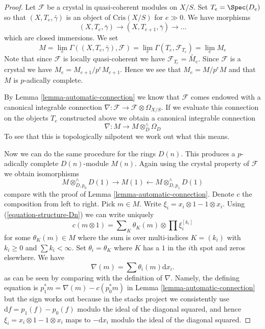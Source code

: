\begin{proof}
Let $\mathcal{F}$ be a crystal in quasi-coherent modules on $X/S$.
Set $T_e = \Spec(D_e)$ so that $(X, T_e, \bar\gamma)$ is an object
of $\text{Cris}(X/S)$ for $e \gg 0$. We have morphisms
$$
(X, T_e, \bar\gamma) \to (X, T_{e + 1}, \bar\gamma) \to \ldots
$$
which are closed immersions. We set
$$
M =
\lim_e \Gamma((X, T_e, \bar\gamma), \mathcal{F}) =
\lim_e \Gamma(T_e, \mathcal{F}_{T_e}) = \lim_e M_e
$$
Note that since $\mathcal{F}$ is locally quasi-coherent we have
$\mathcal{F}_{T_e} = \widetilde{M_e}$. Since $\mathcal{F}$ is a
crystal we have $M_e = M_{e + 1}/p^eM_{e + 1}$. Hence we see that
$M_e = M/p^eM$ and that $M$ is $p$-adically complete.

\medskip\noindent
By Lemma \ref{lemma-automatic-connection} we know that $\mathcal{F}$
comes endowed with a canonical integrable connection
$\nabla : \mathcal{F} \to \mathcal{F} \otimes \Omega_{X/S}$.
If we evaluate this connection on the objects $T_e$ constructed above
we obtain a canonical integrable connection
$$
\nabla : M \longrightarrow M \otimes^\wedge_D \Omega_D
$$
To see that this is topologically nilpotent we work out what this means.

\medskip\noindent
Now we can do the same procedure for the rings $D(n)$.
This produces a $p$-adically complete $D(n)$-module $M(n)$. Again using
the crystal property of $\mathcal{F}$ we obtain isomorphisms
$$
M \otimes^\wedge_{D, p_0} D(1) \rightarrow M(1)
\leftarrow M \otimes^\wedge_{D, p_1} D(1)
$$
compare with the proof of Lemma \ref{lemma-automatic-connection}.
Denote $c$ the composition from left to right. Pick $m \in M$.
Write $\xi_i = x_i \otimes 1 - 1 \otimes x_i$.
Using (\ref{equation-structure-Dn}) we can write uniquely
$$
c(m \otimes 1) = \sum\nolimits_K \theta_K(m) \otimes \prod \xi_i^{[k_i]}
$$
for some $\theta_K(m) \in M$ where the sum is over multi-indices
$K = (k_i)$ with $k_i \geq 0$ and $\sum k_i < \infty$. Set
$\theta_i = \theta_K$ where $K$ has a $1$ in the $i$th spot and
zeros elsewhere. We have
$$
\nabla(m) = \sum \theta_i(m) \text{d}x_i.
$$
as can be seen by comparing with the definition of
$\nabla$. Namely, the defining equation is
$p_1^*m = \nabla(m) - c(p_0^*m)$ in Lemma \ref{lemma-automatic-connection}
but the sign works out because in the stacks project we consistently use
$\text{d}f = p_1(f) - p_0(f)$ modulo the ideal of the diagonal squared,
and hence $\xi_i = x_i \otimes 1 - 1 \otimes x_i$ maps to $-\text{d}x_i$
modulo the ideal of the diagonal squared.


\end{proof}
